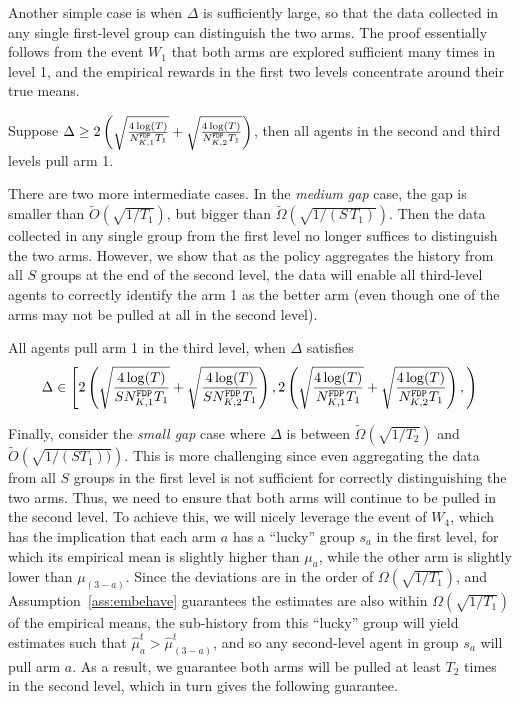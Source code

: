 Another simple case is when $\Delta$ is sufficiently large, so that
the data collected in any single first-level group can distinguish the
two arms. The proof essentially follows from the event $W_1$
that both arms are explored sufficient many times in level 1, and the
empirical rewards in the first two levels concentrate around their
true means.

\begin{lemma}\label{3levelbigcase}
  Suppose
  $\Delta \geq 2\left(\sqrt{\frac{4\log(T)}{\fdpN[1]T_1}} +
    \sqrt{\frac{4\log(T)}{\fdpN[2]T_1}}\right)$, then all agents in the
  second and third levels pull arm 1.
\end{lemma}


There are two more intermediate cases. In the \emph{medium gap} case,
the gap is smaller than $\tilde O(\sqrt{1/T_1})$, but bigger than
$\tilde \Omega(\sqrt{1/(S\, T_1)})$. Then the data collected in any
single group from the first level no longer suffices to distinguish
the two arms. However, we show that as the policy aggregates the
history from all $S$ groups at the end of the second level, the data
will enable all third-level agents to correctly identify the arm 1 as
the better arm (even though one of the arms may not be pulled at all
in the second level).

\begin{lemma}\label{3levelmedium}
  All agents pull arm 1 in the third level, when $\Delta$ satisfies
  \[
  \Delta\in \left[
   2\left(\sqrt{\frac{4\log(T)}{S\fdpN[1]T_1}} +
    \sqrt{\frac{4\log(T)}{S\fdpN[2]T_1}}\right),
 2\left(\sqrt{\frac{4\log(T)}{\fdpN[1]T_1}} +
        \sqrt{\frac{4\log(T)}{\fdpN[2]T_1}}\right), 
    \right)
  \]
\end{lemma}


Finally, consider the \emph{small gap} case where $\Delta$ is between
$\tilde\Omega(\sqrt{1/T_2})$ and $\tilde O(\sqrt{1/(S T_1))})$. This
is more challenging since even aggregating the data from all $S$
groups in the first level is not sufficient for correctly
distinguishing the two arms. Thus, we need to ensure that both arms
will continue to be pulled in the second level. To achieve this, we
will nicely leverage the event of $W_4$, which has the implication
that each arm $a$ has a ``lucky'' group $s_a$ in the first level,
for which its empirical mean is slightly higher than $\mu_a$, while
the other arm is slightly lower than $\mu_{(3-a)}$. Since the
deviations are in the order of $\Omega(\sqrt{1/T_1})$, and Assumption~\ref{ass:embehave} guarantees the estimates are also within $\Omega(\sqrt{1/T_1})$ of the empirical means, the sub-history
from this ``lucky'' group will yield estimates such that
$\hat \mu_a^t > \hat \mu_{(3-a)}^t$, and so any second-level agent in
group $s_a$ will pull arm $a$.  As a result, we guarantee both arms
will be pulled at least $T_2$ times in the second level, which in turn
gives the following guarantee.


